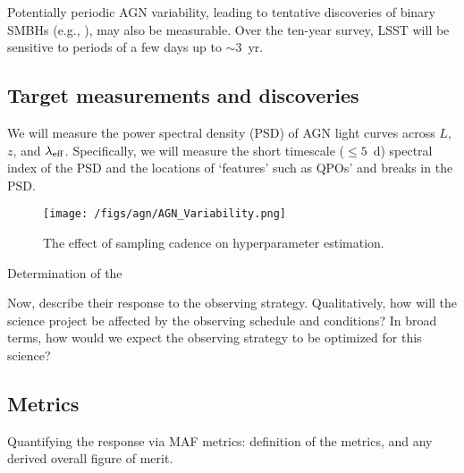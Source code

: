 Potentially periodic AGN variability, leading to tentative discoveries
of binary SMBHs (e.g., \citet{GrahamEtal2015}), may also be
measurable.  Over the ten-year survey, LSST will be sensitive to
periods of a few days up to $\sim3$~yr.




\subsection{Target measurements and discoveries}
\label{sec:\secname:targets}

We will measure the power spectral density (PSD) of AGN light 
curves across $L$, $z$, and $\lambda_{\rm eff}$. Specifically, we will
 measure the short timescale ($\leq 5$~d) spectral index of the PSD and
 the locations of `features' such as QPOs'
 and breaks in the PSD.

\begin{figure}
\texttt{[image: /figs/agn/AGN\_Variability.png]}
\caption{The effect of sampling cadence on hyperparameter estimation.}
\label{CasdenceEffec}
\end{figure}

Determination of the 

Now, describe their response to the observing strategy. Qualitatively,
how will the science project be affected by the observing schedule and
conditions? In broad terms, how would we expect the observing strategy
to be optimized for this science?



\subsection{Metrics}
\label{sec:\secname:metrics}

Quantifying the response via MAF metrics: definition of the metrics,
and any derived overall figure of merit.


